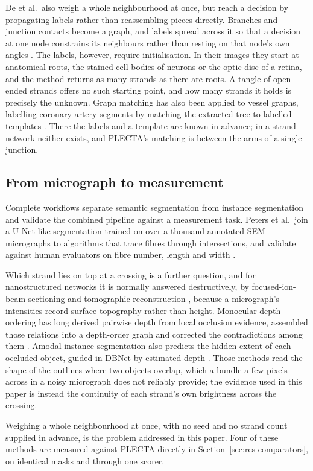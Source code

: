 De et al.\ also weigh a whole neighbourhood at once, but reach a decision by
propagating labels rather than reassembling pieces directly. Branches and
junction
contacts become a graph, and
labels spread across it so that a decision at one node constrains its
neighbours rather than resting on that node's own angles \citep{de2016graph}.
The labels, however, require initialisation. In their images they start at
anatomical roots, the stained cell bodies of neurons or the optic disc of a
retina, and the method returns as many strands as there are roots. A tangle of
open-ended strands offers no such starting point, and how many strands it
holds is precisely the unknown. Graph matching has also been applied to
vessel graphs, labelling coronary-artery segments by matching the extracted
tree to labelled templates \citep{zhao2023agmn,zhao2026multigraph}. There the
labels and a template are known in advance; in a strand network neither
exists, and PLECTA's matching is between the arms of a single junction.

\subsection{From micrograph to measurement}
\label{sec:rel-workflows}

Complete workflows separate semantic segmentation from instance segmentation
and validate the combined pipeline against a measurement task. Peters et al.\
join a U-Net-like segmentation trained on over a thousand annotated SEM
micrographs to algorithms that trace fibres through intersections, and
validate against human evaluators on fibre number, length and width
\citep{peters2026fibre}.

Which strand lies on top at a crossing is a further question, and for
nanostructured networks it is normally answered destructively, by
focused-ion-beam sectioning and tomographic reconstruction
\citep{gabbett2024fibsem}, because a micrograph's intensities record surface
topography rather than height. Monocular depth ordering has long derived
pairwise depth from local occlusion evidence, assembled those relations into a
depth-order graph and corrected the contradictions among them
\citep{palou2013monocular,lee2022instancewise}. Amodal instance segmentation also predicts the
hidden extent of each occluded object, guided in DBNet by estimated depth
\citep{zhang2025dbnet}. Those methods read the shape of the outlines where
two objects overlap, which a bundle a few pixels across in a noisy micrograph
does not reliably provide; the evidence used in this paper is instead the
continuity of each strand's own brightness across the crossing.

Weighing a whole neighbourhood at once, with no seed and no strand count
supplied in advance, is the problem addressed in this paper. Four of these
methods are measured against PLECTA directly in
Section~\ref{sec:res-comparators}, on identical masks and through one scorer.
